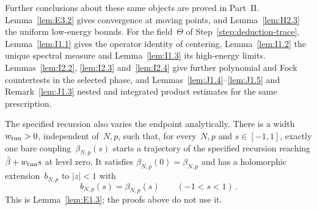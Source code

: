 \begin{remark}\label{rem:further-results}
Further conclusions about these same objects are proved in Part~II. Lemma~\ref{lem:E3.2} gives convergence at moving points, and Lemma~\ref{lem:H2.3} the uniform low-energy bounds. For the field~$\Theta$ of Step~\ref{step:deduction-trace}, Lemma~\ref{lem:I1.1} gives the operator identity of centering, Lemma~\ref{lem:I1.2} the unique spectral measure and Lemma~\ref{lem:I1.3} its high-energy limits. Lemmas~\ref{lem:I2.2}, \ref{lem:I2.3} and~\ref{lem:I2.4} give further polynomial and Fock countertests in the selected phase, and Lemmas~\ref{lem:J1.4}--\ref{lem:J1.5} and Remark~\ref{lem:J1.3} nested and integrated product estimates for the same prescription.
\end{remark}

\begin{remark}\label{prop:endpoint-tuning}
The specified recursion also varies the endpoint analytically. There is a width $w_{\rm tun}>0$, independent of~$N,p$, such that, for every~$N,p$ and $s\in[-1,1]$, exactly one bare coupling~$\beta_{N,p}(s)$ starts a trajectory of the specified recursion reaching $\bar\beta+w_{\rm tun}s$ at level zero. It satisfies $\beta_{N,p}(0)=\beta_{N,p}$ and has a holomorphic extension~$b_{N,p}$ to $|z|<1$ with
\begin{equation}\label{eq:I12-endpoint-tuning}
b_{N,p}(s)=\beta_{N,p}(s)\qquad(-1<s<1)\,.
\end{equation}
This is Lemma~\ref{lem:E1.3}; the proofs above do not use it.
\end{remark}
